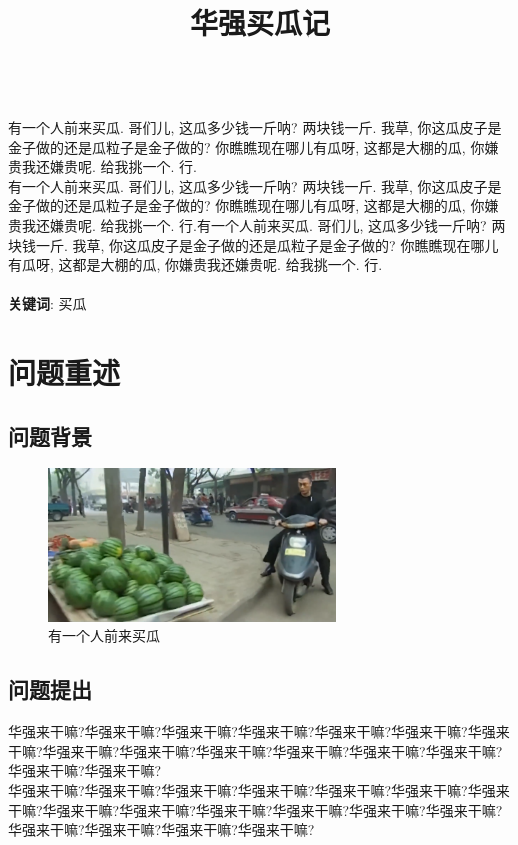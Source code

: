 \documentclass[]{article}
\begin{document}
\title{华强买瓜记}
\maketitle

~\\
\indent 有一个人前来买瓜. 哥们儿, 这瓜多少钱一斤呐? 两块钱一斤. 我草, 你这瓜皮子是金子做的还是瓜粒子是金子做的? 你瞧瞧现在哪儿有瓜呀, 这都是大棚的瓜, 你嫌贵我还嫌贵呢. 给我挑一个. 行.\\
\indent 有一个人前来买瓜. 哥们儿, 这瓜多少钱一斤呐? 两块钱一斤. 我草, 你这瓜皮子是金子做的还是瓜粒子是金子做的? 你瞧瞧现在哪儿有瓜呀, 这都是大棚的瓜, 你嫌贵我还嫌贵呢. 给我挑一个. 行.有一个人前来买瓜. 哥们儿, 这瓜多少钱一斤呐? 两块钱一斤. 我草, 你这瓜皮子是金子做的还是瓜粒子是金子做的? 你瞧瞧现在哪儿有瓜呀, 这都是大棚的瓜, 你嫌贵我还嫌贵呢. 给我挑一个. 行.\\
~\\
\textbf{关键词}: 买瓜

\newpage

\section{问题重述}

\subsection{问题背景}
\begin{figure}[h]
    \centering
    \includegraphics[width=3in]{buy.png}
    \caption{有一个人前来买瓜}
    \label{}
\end{figure}
\subsection{问题提出}

\indent 华强来干嘛?华强来干嘛?华强来干嘛?华强来干嘛?华强来干嘛?华强来干嘛?华强来干嘛?华强来干嘛?华强来干嘛?华强来干嘛?华强来干嘛?华强来干嘛?华强来干嘛?华强来干嘛?华强来干嘛?\\
\indent 华强来干嘛?华强来干嘛?华强来干嘛?华强来干嘛?华强来干嘛?华强来干嘛?华强来干嘛?华强来干嘛?华强来干嘛?华强来干嘛?华强来干嘛?华强来干嘛?华强来干嘛?华强来干嘛?华强来干嘛?华强来干嘛?华强来干嘛?\\
\end{document}
